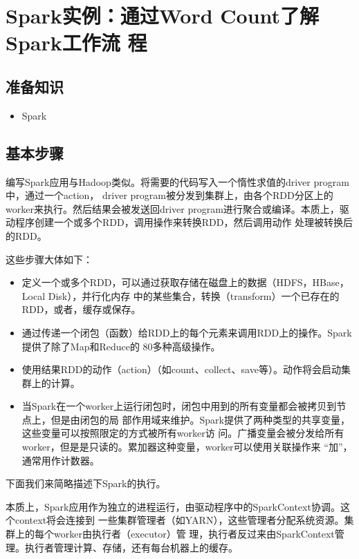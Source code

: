 \section{Spark实例：通过Word Count了解Spark工作流
  程
}\label{ux5b9eux4f8bux5206ux6790ux901aux8fc7word-countux4e86ux89e3sparkux5de5ux4f5cux6d41ux7a0b}

\subsection{准备知识}\label{ux51c6ux5907ux77e5ux8bc6}

\begin{itemize}
\itemsep1pt\parskip0pt
\item
  Spark
\end{itemize}

\subsection{基本步骤}\label{ux57faux672cux6b65ux9aa4}

编写Spark应用与Hadoop类似。将需要的代码写入一个惰性求值的driver
program中，通过一个action， driver
program被分发到集群上，由各个RDD分区上的worker来执行。然后结果会被发送回driver
program进行聚合或编译。本质上，驱动程序创建一个或多个RDD，调用操作来转换RDD，然后调用动作
处理被转换后的RDD。

这些步骤大体如下：

\begin{itemize}
\item
  定义一个或多个RDD，可以通过获取存储在磁盘上的数据（HDFS，HBase，Local
  Disk），并行化内存
  中的某些集合，转换（transform）一个已存在的RDD，或者，缓存或保存。
\item
  通过传递一个闭包（函数）给RDD上的每个元素来调用RDD上的操作。Spark提供了除了Map和Reduce的
  80多种高级操作。
\item
  使用结果RDD的动作（action）（如count、collect、save等）。动作将会启动集群上的计算。
\item
  当Spark在一个worker上运行闭包时，闭包中用到的所有变量都会被拷贝到节点上，但是由闭包的局
  部作用域来维护。Spark提供了两种类型的共享变量，这些变量可以按照限定的方式被所有worker访
  问。广播变量会被分发给所有worker，但是是只读的。累加器这种变量，worker可以使用关联操作来
  ``加''，通常用作计数器。
\end{itemize}

下面我们来简略描述下Spark的执行。

本质上，Spark应用作为独立的进程运行，由驱动程序中的SparkContext协调。这个context将会连接到
一些集群管理者（如YARN），这些管理者分配系统资源。集群上的每个worker由执行者（executor）管
理，执行者反过来由SparkContext管理。执行者管理计算、存储，还有每台机器上的缓存。

